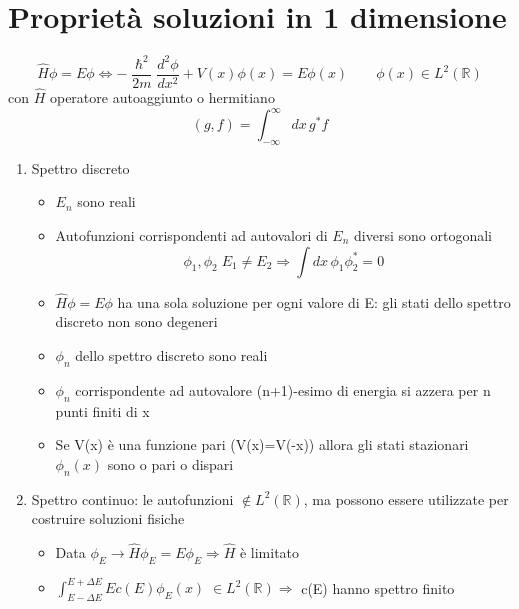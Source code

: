 \documentclass[a4paper,11pt]{report}
\theoremstyle{remark}
\theoremstyle{definition}
\newcommand{\R}{\mathbb{R}}
\begin{document}
\chapter{Proprietà soluzioni in 1 dimensione}

\begin{equation*}
    \hat{H}\phi = E\phi \iff -\frac{\hslash^2}{2m}\frac{d^2\phi}{dx^2} + V(x)\phi(x) = E \phi(x) \qquad \phi(x) \in L^2(\R)
\end{equation*}
con $\hat{H}$ operatore autoaggiunto o hermitiano
\begin{equation*}
    (g,f) = \int_{-\infty}^\infty dx \, g^*f
\end{equation*}
\begin{enumerate}
    \item Spettro discreto
    \begin{itemize}
        \item $E_n$ sono reali
        \item Autofunzioni corrispondenti ad autovalori di $E_n$ diversi sono ortogonali
        \begin{equation*}
            \phi_1,\phi_2 \; E_1 \neq E_2 \Rightarrow \int dx \, \phi_1\phi_2^* = 0
        \end{equation*}
        \item $\hat{H}\phi = E\phi$ ha una sola soluzione per ogni valore di E: gli stati dello spettro discreto non sono degeneri
        \item $\phi_n$ dello spettro discreto sono reali
        \item $\phi_n$ corrispondente ad autovalore (n+1)-esimo di energia si azzera per n punti finiti di x
        \item Se V(x) è una funzione pari (V(x)=V(-x)) allora gli stati stazionari $\phi_n(x)$ sono o pari o dispari   
    \end{itemize}
    \item Spettro continuo: le autofunzioni $\not\in L^2(\R)$, ma possono essere utilizzate per costruire soluzioni fisiche 
    \begin{itemize}
        \item Data $\phi_E \rightarrow \hat{H}\phi_E = E\phi_E \Rightarrow \hat{H}$ è limitato
        \item $\int_{E-\Delta E}^{E+ \Delta E} E c(E)\phi_E(x) \; \in L^2(\R) \Rightarrow$ c(E) hanno spettro finito 
    \end{itemize}
\end{enumerate}
\end{document}
